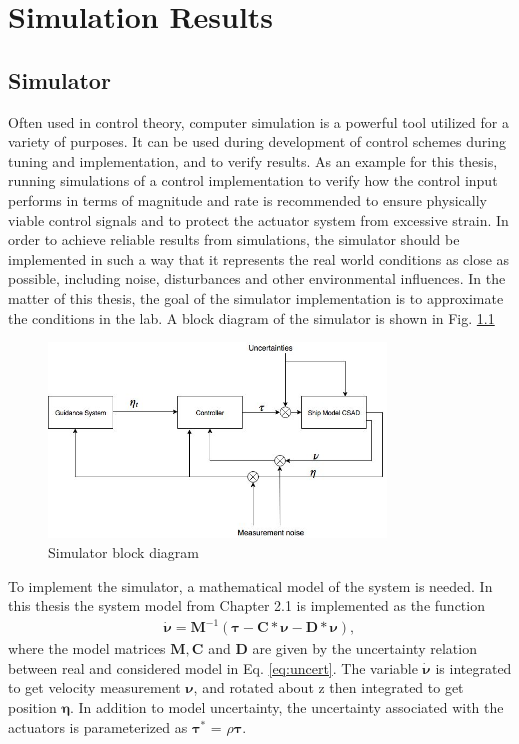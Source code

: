 
\chapter{Simulation Results}

\section{Simulator}
Often used in control theory, computer simulation is a powerful tool utilized for a variety of purposes. It can be used during development of control schemes during tuning and implementation, and to verify results. As an example for this thesis, running simulations of a control implementation to verify how the control input performs in terms of magnitude and rate is recommended to ensure physically viable control signals and to protect the actuator system from excessive strain.  In order to achieve reliable results from simulations, the simulator should be implemented in such a way that it represents the real world conditions as close as possible, including noise, disturbances and other environmental influences. In the matter of this thesis, the goal of the simulator implementation is to approximate the conditions in the lab. A block diagram of the simulator is shown in Fig. \ref{fig:Simulator} 

\begin{figure}[!h]
\centering
\includegraphics[width=0.8\textwidth]{fig/Simulator.jpg}
\caption{Simulator block diagram}
\label{fig:Simulator}
\end{figure}

To implement the simulator, a mathematical model of the system is needed. In this thesis the system model from Chapter 2.1 is implemented as the function 
\begin{align}
    \Dot{\boldsymbol{\nu}} = \boldsymbol{M}^{-1}(\boldsymbol{\tau} - \boldsymbol{C*\nu} - \boldsymbol{D*\nu}),
\end{align}
where the model matrices $\boldsymbol{M,C}$ and $\boldsymbol{D}$ are given by the uncertainty relation between real and considered model in Eq. \ref{eq:uncert}. The variable $\Dot{\boldsymbol{\nu}}$ is integrated to get velocity measurement $\boldsymbol{\nu}$, and rotated about z then integrated to get position $\boldsymbol{\eta}$. In addition to model uncertainty, the uncertainty associated with the actuators is parameterized as $\boldsymbol{\tau}^*$ = $\rho \boldsymbol{\tau}$.

